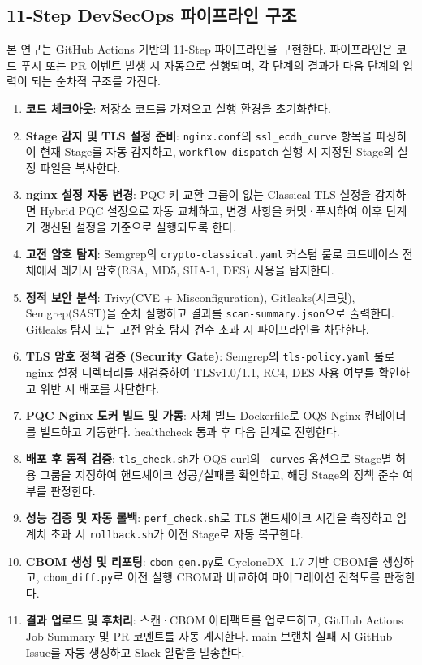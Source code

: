 \subsection{11-Step DevSecOps 파이프라인 구조}

본 연구는 GitHub Actions 기반의 11-Step 파이프라인을 구현한다.
파이프라인은 코드 푸시 또는 PR 이벤트 발생 시 자동으로 실행되며, 각 단계의 결과가 다음 단계의 입력이 되는 순차적 구조를 가진다.

\begin{enumerate}[itemsep=2pt]
  \item \textbf{코드 체크아웃}: 저장소 코드를 가져오고 실행 환경을 초기화한다.
  \item \textbf{Stage 감지 및 TLS 설정 준비}: \texttt{nginx.conf}의 \texttt{ssl\_ecdh\_curve} 항목을 파싱하여 현재 Stage를 자동 감지하고, \texttt{workflow\_dispatch} 실행 시 지정된 Stage의 설정 파일을 복사한다.
  \item \textbf{nginx 설정 자동 변경}: PQC 키 교환 그룹이 없는 Classical TLS 설정을 감지하면 Hybrid PQC 설정으로 자동 교체하고, 변경 사항을 커밋·푸시하여 이후 단계가 갱신된 설정을 기준으로 실행되도록 한다.
  \item \textbf{고전 암호 탐지}: Semgrep의 \texttt{crypto-classical.yaml} 커스텀 룰로 코드베이스 전체에서 레거시 암호(RSA, MD5, SHA-1, DES) 사용을 탐지한다.
  \item \textbf{정적 보안 분석}: Trivy(CVE + Misconfiguration), Gitleaks(시크릿), Semgrep(SAST)을 순차 실행하고 결과를 \texttt{scan-summary.json}으로 출력한다. Gitleaks 탐지 또는 고전 암호 탐지 건수 초과 시 파이프라인을 차단한다.
  \item \textbf{TLS 암호 정책 검증 (Security Gate)}: Semgrep의 \texttt{tls-policy.yaml} 룰로 nginx 설정 디렉터리를 재검증하여 TLSv1.0/1.1, RC4, DES 사용 여부를 확인하고 위반 시 배포를 차단한다.
  \item \textbf{PQC Nginx 도커 빌드 및 가동}: 자체 빌드 Dockerfile로 OQS-Nginx 컨테이너를 빌드하고 기동한다. healthcheck 통과 후 다음 단계로 진행한다.
  \item \textbf{배포 후 동적 검증}: \texttt{tls\_check.sh}가 OQS-curl의 \texttt{--curves} 옵션으로 Stage별 허용 그룹을 지정하여 핸드셰이크 성공/실패를 확인하고, 해당 Stage의 정책 준수 여부를 판정한다.
  \item \textbf{성능 검증 및 자동 롤백}: \texttt{perf\_check.sh}로 TLS 핸드셰이크 시간을 측정하고 임계치 초과 시 \texttt{rollback.sh}가 이전 Stage로 자동 복구한다.
  \item \textbf{CBOM 생성 및 리포팅}: \texttt{cbom\_gen.py}로 CycloneDX~1.7 기반 CBOM을 생성하고, \texttt{cbom\_diff.py}로 이전 실행 CBOM과 비교하여 마이그레이션 진척도를 판정한다.
  \item \textbf{결과 업로드 및 후처리}: 스캔·CBOM 아티팩트를 업로드하고, GitHub Actions Job Summary 및 PR 코멘트를 자동 게시한다. main 브랜치 실패 시 GitHub Issue를 자동 생성하고 Slack 알람을 발송한다.
\end{enumerate}

